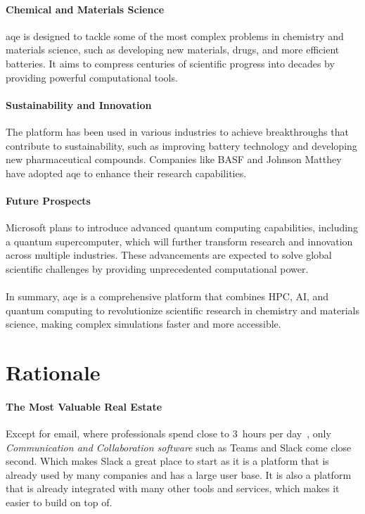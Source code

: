 \documentclass{tufte-handout}
\begin{document}
\paragraph{Chemical and Materials Science}\label{sec:chemical-and-materials-science}
\gls{aqe} is designed to tackle some of the most complex problems in chemistry and materials science, such as developing new materials, drugs, and more efficient batteries. It aims to compress centuries of scientific progress into decades by providing powerful computational tools.
\paragraph{Sustainability and Innovation}\label{sec:sustainability-and-innovation}
The platform has been used in various industries to achieve breakthroughs that contribute to sustainability, such as improving battery technology and developing new pharmaceutical compounds. Companies like BASF and Johnson Matthey have adopted \gls{aqe} to enhance their research capabilities.
\paragraph{Future Prospects}\label{sec:future-prospects}
Microsoft plans to introduce advanced quantum computing capabilities, including a quantum supercomputer, which will further transform research and innovation across multiple industries. These advancements are expected to solve global scientific challenges by providing unprecedented computational power.
\paragraph{}\label{sec:summary}
In summary, \gls{aqe} is a comprehensive platform that combines HPC, AI, and quantum computing to revolutionize scientific research in chemistry and materials science, making complex simulations faster and more accessible.









\section{Rationale}\label{sec:Rationale}
\paragraph{The Most Valuable Real Estate}\label{sec:real-estate} Except for  email, where professionals spend close to 3~hours per day~\cite[+5pt]{mattplummerHowSpendWay2019}, only \emph{Communication and Collaboration software} such as Teams and Slack come close second. Which makes Slack a great place to start as it is a platform that is already used by many companies and has a large user base. 
It is also a platform that is already integrated with many other tools and services, which makes it easier to build on top of.
\end{document}
